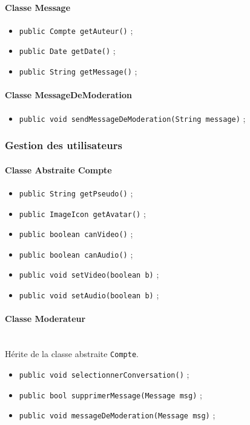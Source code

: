 \documentclass[11pt,dvipsnames,svgnames]{report}
\begin{document}
\paragraph*{Classe Message}
\begin{itemize}
\item \texttt{public Compte getAuteur()} ;
\item \texttt{public Date getDate()} ;
\item \texttt{public String getMessage()} ;
\end{itemize}

\paragraph*{Classe MessageDeModeration}
\begin{itemize}
\item \texttt{public void sendMessageDeModeration(String message)} ;

\end{itemize}

\subsubsection{\og Gestion des utilisateurs \fg}

\paragraph*{Classe Abstraite Compte}
\begin{itemize}
\item \texttt{public String getPseudo()} ;
\item \texttt{public ImageIcon getAvatar()} ;
\item \texttt{public boolean canVideo()} ;
\item \texttt{public boolean canAudio()} ;
\item \texttt{public void setVideo(boolean b)} ;
\item \texttt{public void setAudio(boolean b)} ;
\end{itemize}

\paragraph*{Classe Moderateur}~\\
Hérite de la classe abstraite \texttt{Compte}.
\begin{itemize}
\item \texttt{public void selectionnerConversation()} ;
\item \texttt{public bool supprimerMessage(Message msg)} ;
\item \texttt{public void messageDeModeration(Message msg)} ;
\end{itemize}
\end{document}
